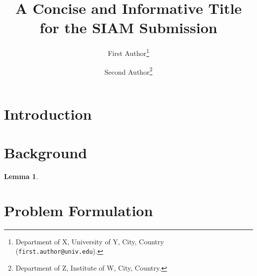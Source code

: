 \documentclass[11pt]{article}
\title{A Concise and Informative Title for the SIAM Submission}
\author{First Author\thanks{Department of X, University of Y, City, Country
  (\texttt{first.author@univ.edu}).} \and Second Author\thanks{Department of Z,
  Institute of W, City, Country.}}
\date{}
\newtheorem{lemma}[theorem]{Lemma}
\theoremstyle{definition}
\theoremstyle{remark}
\begin{document}
\maketitle

\begin{abstract}
\end{abstract}

\section{Introduction}
\label{sec:intro}

\section{Background}
\label{sec:background}

\begin{lemma}
\label{lem:example}
\end{lemma}

\section{Problem Formulation}
\label{sec:problem}
\end{document}
